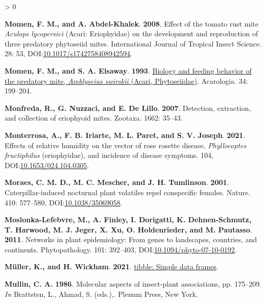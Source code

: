 \documentclass{ufdissertation}[overrideChapters] %
\newlength{\cslhangindent}
\newenvironment{CSLReferences}[2] %
 {%
  \setlength{\parindent}{0pt}
  \ifodd #1 \everypar{\setlength{\hangindent}{\cslhangindent}}\ignorespaces\fi
  \ifnum #2 > 0
  \setlength{\parskip}{#2\baselineskip}
  \fi
 }%
 {}
\begin{document}
{\begin{CSLReferences}{1}{1}
\leavevmode{}%
\textbf{Momen, F. M., and A. Abdel-Khalek}. \textbf{2008}. Effect of the tomato rust mite {\emph{Aculops lycopersici}} ({Acari}: {Eriophyidae}) on the development and reproduction of three predatory phytoseiid mites. International Journal of Tropical Insect Science. 28: 53, DOI:\href{https://doi.org/10.1017/s1742758408942594}{10.1017/s1742758408942594}.

\leavevmode{}%
\textbf{Momen, F. M., and S. A. Elsaway}. \textbf{1993}. \href{http://www1.montpellier.inra.fr/CBGP/acarologia/article.php?id=2349}{Biology and feeding behavior of the predatory mite, {\emph{Amblyseius swirskii}} ({Acari}, {Phytoseiidae})}. Acarologia. 34: 199--204.

\leavevmode{}%
\textbf{Monfreda, R., G. Nuzzaci, and E. De Lillo}. \textbf{2007}. Detection, extraction, and collection of eriophyoid mites. Zootaxa. 1662: 35--43.

\leavevmode{}%
\textbf{Monterrosa, A., F. B. Iriarte, M. L. Paret, and S. V. Joseph}. \textbf{2021}. Effects of relative humidity on the vector of rose rosette disease, {\emph{Phyllocoptes fructiphilus}} (eriophyidae), and incidence of disease symptoms. 104, DOI:\href{https://doi.org/10.1653/024.104.0305}{10.1653/024.104.0305}.

\leavevmode{}%
\textbf{Moraes, C. M. D., M. C. Mescher, and J. H. Tumlinson}. \textbf{2001}. Caterpillar-induced nocturnal plant volatiles repel conspecific females. Nature. 410: 577--580, DOI:\href{https://doi.org/10.1038/35069058}{10.1038/35069058}.

\leavevmode{}%
\textbf{Moslonka-Lefebvre, M., A. Finley, I. Dorigatti, K. Dehnen-Schmutz, T. Harwood, M. J. Jeger, X. Xu, O. Holdenrieder, and M. Pautasso}. \textbf{2011}. Networks in plant epidemiology: From genes to landscapes, countries, and continents. Phytopathology{\textregistered}. 101: 392--403, DOI:\href{https://doi.org/10.1094/phyto-07-10-0192}{10.1094/phyto-07-10-0192}.

\leavevmode{}%
\textbf{Müller, K., and H. Wickham}. \textbf{2021}. \href{https://CRAN.R-project.org/package=tibble}{{tibble}: Simple data frames}.

\leavevmode{}%
\textbf{Mullin, C. A.} \textbf{1986}. Molecular aspects of insect-plant associations, pp. 175--209. \emph{In} Brattsten, L., Ahmad, S. (eds.),. Plenum Press, New York.


\end{CSLReferences}}
\end{document}
